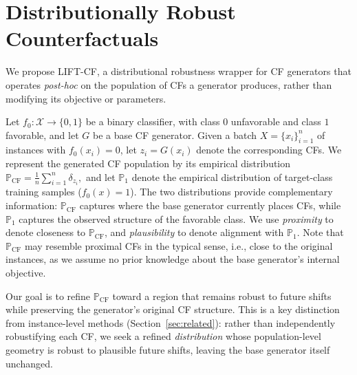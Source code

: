\section{Distributionally Robust Counterfactuals}

We propose \textsc{LIFT-CF}, a distributional robustness wrapper for CF generators that operates \emph{post-hoc} on the population of CFs a generator produces, rather than modifying its objective or parameters.


Let $f_0: \mathcal{X}\to\{0,1\}$ be a binary classifier, with class $0$ unfavorable and class $1$ favorable, and let $G$ be a base CF generator. Given a batch $X=\{x_i\}_{i=1}^n$ of instances with $f_0(x_i)=0$, let $z_i = G(x_i)$ denote the corresponding CFs.
We represent the generated CF population by its empirical distribution
$
\mathbb{P}_{\mathrm{CF}} = \frac{1}{n}\sum_{i=1}^n \delta_{z_i},
$
and let $\mathbb{P}_1$ denote the empirical distribution of target-class training samples ($f_0(x)=1$).
The two distributions provide complementary information: $\mathbb{P}_{\mathrm{CF}}$ captures where the base generator currently places CFs, while $\mathbb{P}_1$ captures the observed structure of the favorable class. 
We use \emph{proximity} to denote closeness to $\mathbb P_{\mathrm{CF}}$, and \emph{plausibility} to denote alignment with $\mathbb P_1$. 
Note that $\mathbb P_{\mathrm{CF}}$ may resemble proximal CFs in the typical sense, i.e., close to the original instances, as we assume no prior knowledge about the base generator's internal objective.

Our goal is to refine $\mathbb P_{\mathrm{CF}}$ toward a region that remains robust to future shifts while preserving the generator's original CF structure.
This is a key distinction from instance-level methods (Section~\ref{sec:related}): rather than independently robustifying each CF, we seek a refined \emph{distribution} whose population-level geometry is robust to plausible future shifts, leaving the base generator itself unchanged.


